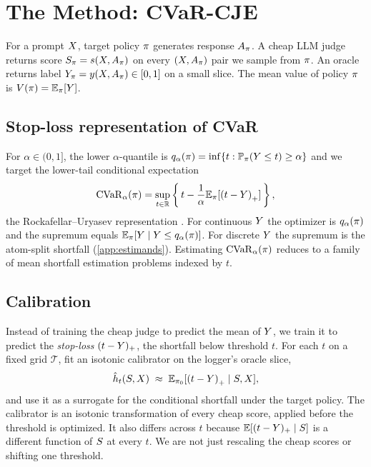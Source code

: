 \section{The Method: CVaR-CJE}
\label{sec:method}

For a prompt $X$, target policy $\pi$ generates response
$A_\pi$. A cheap LLM judge returns score
$S_\pi = s(X, A_\pi)$ on every $(X, A_\pi)$ pair
we sample from $\pi$. An oracle returns label $Y_\pi = y(X,
A_\pi) \in [0, 1]$ on a small slice. The mean value of policy
$\pi$ is $V(\pi) = \mathbb{E}_\pi[Y]$.

\subsection{Stop-loss representation of CVaR}
\label{sec:method-stoploss}

For $\alpha \in (0, 1]$, the lower $\alpha$-quantile is
$q_\alpha(\pi) = \inf\{t : \mathbb{P}_\pi(Y \le t) \ge \alpha\}$ and
we target the lower-tail conditional expectation
\begin{equation}
\mathrm{CVaR}_\alpha(\pi) = \sup_{t \in \mathbb{R}}\left\{\,t - \frac{1}{\alpha}
\mathbb{E}_\pi[\left(t-Y\right)_{+}]\,\right\},
\label{eq:stoploss-cvar}
\end{equation}
the Rockafellar--Uryasev representation
\citep{RockafellarUryasev2000,RockafellarUryasev2002}. For continuous $Y$
the optimizer is $q_\alpha(\pi)$ and the supremum equals
$\mathbb{E}_\pi[Y \mid Y \le q_\alpha(\pi)]$. For discrete $Y$ the
supremum is the atom-split shortfall (\cref{app:estimands}). Estimating
$\mathrm{CVaR}_\alpha(\pi)$ reduces to a family of mean shortfall
estimation problems indexed by $t$.

\subsection{Calibration}
\label{sec:method-calibration}

Instead of training the cheap judge to predict the mean of $Y$, we
train it to predict the \emph{stop-loss} $(t-Y)_+$, the shortfall below
threshold $t$. For each $t$ on a fixed grid $\mathcal{T}$, fit an
isotonic calibrator on the logger's oracle slice,
\begin{equation}
\hat h_t(S, X) \;\approx\; \mathbb{E}_{\pi_{0}}[\left(t-Y\right)_{+} \mid
S, X],
\end{equation}
and use it as a surrogate for the conditional shortfall under the
target policy. The calibrator is an isotonic transformation of every
cheap score, applied before the threshold is optimized. It also
differs across $t$ because $\mathbb{E}[(t-Y)_+ \mid S]$ is a different
function of $S$ at every $t$. We are not just rescaling the cheap
scores or shifting one threshold.

